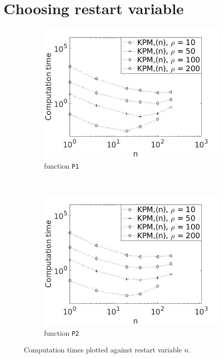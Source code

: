 \section{Choosing restart variable }
\begin{figure}[H]
        \centering
        \begin{subfigure}[b]{0.45\textwidth}
                \includegraphics[width=\textwidth]{fig/s9rest1}
                \caption{function \texttt{P1}}
                \label{fig:rest1}
        \end{subfigure}
~
        \begin{subfigure}[b]{0.45\textwidth}
                \includegraphics[width=\textwidth]{fig/s10rest2}
                \caption{function \texttt{P2}}
                \label{fig:rest2}
        \end{subfigure}
        \caption{Computation times plotted against restart variable $n$.}\label{fig:rest}
\end{figure}
